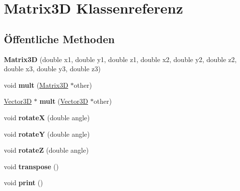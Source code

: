 \hypertarget{classMatrix3D}{\section{Matrix3\-D Klassenreferenz}
\label{classMatrix3D}
}
\subsection*{Öffentliche Methoden}
\begin{DoxyCompactItemize}
\item 
\hypertarget{classMatrix3D_abd8f512d6fdfda45bfe655ae38cde303}{{\bfseries Matrix3\-D} (double x1, double y1, double z1, double x2, double y2, double z2, double x3, double y3, double z3)}\label{classMatrix3D_abd8f512d6fdfda45bfe655ae38cde303}

\item 
\hypertarget{classMatrix3D_a399be81028219044a03439b2ff93782a}{void {\bfseries mult} (\hyperlink{classMatrix3D}{Matrix3\-D} $\ast$other)}\label{classMatrix3D_a399be81028219044a03439b2ff93782a}

\item 
\hypertarget{classMatrix3D_adb30531e4dd89eb99ed2fb7f94269122}{\hyperlink{classVector3D}{Vector3\-D} $\ast$ {\bfseries mult} (\hyperlink{classVector3D}{Vector3\-D} $\ast$other)}\label{classMatrix3D_adb30531e4dd89eb99ed2fb7f94269122}

\item 
\hypertarget{classMatrix3D_ada7ce7ea9f2d0ef0fdda60ad73dad345}{void {\bfseries rotate\-X} (double angle)}\label{classMatrix3D_ada7ce7ea9f2d0ef0fdda60ad73dad345}

\item 
\hypertarget{classMatrix3D_a649e1aa65466df65d63f1aef934e5fad}{void {\bfseries rotate\-Y} (double angle)}\label{classMatrix3D_a649e1aa65466df65d63f1aef934e5fad}

\item 
\hypertarget{classMatrix3D_ad1933b95fb776dd31ad1b81d3515b029}{void {\bfseries rotate\-Z} (double angle)}\label{classMatrix3D_ad1933b95fb776dd31ad1b81d3515b029}

\item 
\hypertarget{classMatrix3D_a0d59cb6ea927264477a10b9d427966d6}{void {\bfseries transpose} ()}\label{classMatrix3D_a0d59cb6ea927264477a10b9d427966d6}

\item 
\hypertarget{classMatrix3D_a33c771d35de761fafc619773e1b253c5}{void {\bfseries print} ()}\label{classMatrix3D_a33c771d35de761fafc619773e1b253c5}

\end{DoxyCompactItemize}
